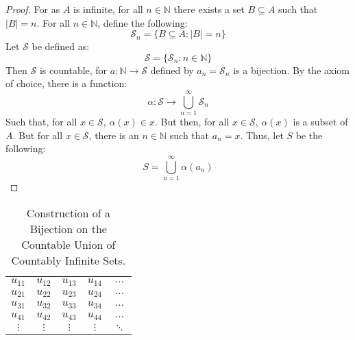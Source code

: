 \documentclass[crop=false,class=book,oneside]{standalone}
\begin{document}
            \begin{proof}
                For as $A$ is infinite, for all $n\in\mathbb{N}$
                there exists a set $B\subseteq{A}$ such that
                $|B|=n$. For all $n\in\mathbb{N}$,
                define the following:
                \begin{equation}
                    \mathcal{S}_{n}=\{B\subseteq{A}:|B|=n\}
                \end{equation}
                Let $\mathcal{S}$ be defined as:
                \begin{equation}
                    \mathcal{S}=\{\mathcal{S}_{n}:n\in\mathbb{N}\}
                \end{equation}
                Then $\mathcal{S}$ is countable, for
                $a:\mathbb{N}\rightarrow\mathcal{S}$ defined
                by $a_{n}=\mathcal{S}_{n}$ is a bijection.
                By the axiom of choice, there is a function:
                \begin{equation}
                    \alpha:\mathcal{S}\rightarrow
                    \bigcup_{n=1}^{\infty}\mathcal{S}_{n}
                \end{equation}
                Such that, for all $x\in\mathcal{S}$,
                $\alpha(x)\in{x}$. But then, for all
                $x\in\mathcal{S}$, $\alpha(x)$ is a subset
                of $A$. But for all $x\in\mathcal{S}$, there
                is an $n\in\mathbb{N}$ such that
                $a_{n}=x$. Thus, let $S$ be the following:
                \begin{equation}
                    S=\bigcup_{n=1}^{\infty}\alpha(a_{n})
                \end{equation}
            \end{proof}
            \begin{table}[H]
                \captionsetup{type=table}
                \centering
                \begin{tabular}{ccccc}
                    $u_{11}$&$u_{12}$&$u_{13}$
                    &$u_{14}$&$\hdots$\\
                    $u_{21}$&$u_{22}$&$u_{23}$
                    &$u_{24}$&$\hdots$\\
                    $u_{31}$&$u_{32}$&$u_{33}$
                    &$u_{34}$&$\hdots$\\
                    $u_{41}$&$u_{42}$&$u_{43}$
                    &$u_{44}$&$\hdots$\\
                    $\vdots$&$\vdots$&$\vdots$
                    &$\vdots$&$\ddots$
                \end{tabular}
                \caption{Construction of a Bijection on the
                         Countable Union of Countably Infinite
                         Sets.}
                \label{table:Countable_Union_of_Countable}
            \end{table}
\end{document}
